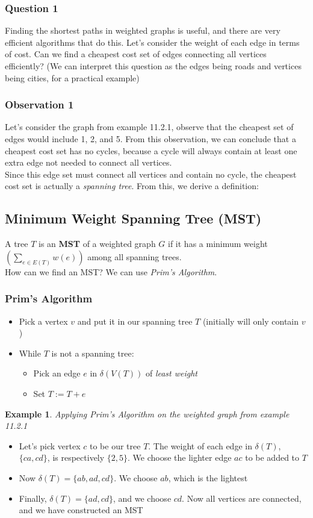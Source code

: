\documentclass{report}
\newtheorem{ex}{Example}[section]
\begin{document}
\subsubsection{Question 1}
Finding the shortest paths in weighted graphs is useful, and there are very efficient algorithms that do this. Let's consider the weight of each edge in terms of cost. Can we find a cheapest cost set of edges connecting all vertices efficiently? (We can interpret this question as the edges being roads and vertices being cities, for a practical example)
\subsubsection{Observation 1}
Let's consider the graph from example 11.2.1, observe that the cheapest set of edges would include 1, 2, and 5. From this observation, we can conclude that a cheapest cost set has no cycles, because a cycle will always contain at least one extra edge not needed to connect all vertices.\\Since this edge set must connect all vertices and contain no cycle, the cheapest cost set is actually a \textit{spanning tree}. From this, we derive a definition:
\subsection{Minimum Weight Spanning Tree (MST)}
A tree $T$ is an \textbf{MST} of a weighted graph $G$ if it has a minimum weight $\displaystyle\left(\sum_{e \in E(T)} w(e)\right)$ among all spanning trees. \\
How can we find an MST? We can use \textit{Prim's Algorithm}.
\subsubsection{Prim's Algorithm}
\begin{itemize}
\item Pick a vertex $v$ and put it in our spanning tree $T$ (initially will only contain $v$)
\item While $T$ is not a spanning tree:
\begin{itemize}
\item Pick an edge $e$ in $\delta(V(T))$ of \textit{least weight}
\item Set $T := T + e$
\end{itemize}
\end{itemize}
\begin{ex}
Applying Prim's Algorithm on the weighted graph from example 11.2.1
\end{ex}
\begin{itemize}
\item Let's pick vertex $c$ to be our tree $T$. The weight of each edge in $\delta(T)$, $\{ca, cd\}$, is respectively $\{2, 5\}$. We choose the lighter edge $ac$ to be added to $T$
\item Now $\delta(T) = \{ab, ad, cd\}$. We choose $ab$, which is the lightest
\item Finally, $\delta(T) = \{ad, cd\}$, and we choose $cd$. Now all vertices are connected, and we have constructed an MST
\end{itemize}
\end{document}

